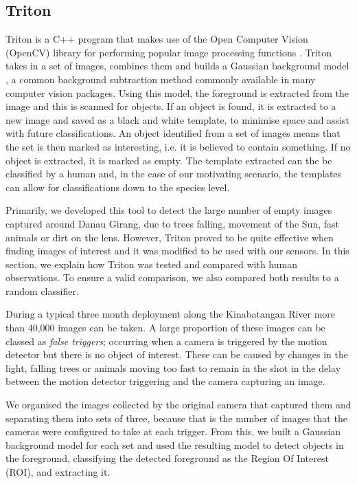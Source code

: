 	\subsection{Triton} \label{tech:sf:triton}
		Triton is a C++ program that makes use of the Open Computer Vision (OpenCV) \cite{opencv_library} library for performing popular image processing functions \cite{triton}. Triton takes in a set of images, combines them and builds a Gaussian background model \cite{Zivkovic2004}, a common background subtraction method commonly available in many computer vision packages. Using this model, the foreground is extracted from the image and this is scanned for objects. If an object is found, it is extracted to a new image and saved as a black and white template, to minimise space and assist with future classifications. An object identified from a set of images means that the set is then marked as interesting, i.e. it is believed to contain something. If no object is extracted, it is marked as empty. The template extracted can the be classified by a human and, in the case of our motivating scenario, the templates can allow for classifications down to the species level.
		
		Primarily, we developed this tool to detect the large number of empty images captured around Danau Girang, due to trees falling, movement of the Sun, fast animals or dirt on the lens. However, Triton proved to be quite effective when finding images of interest and it was modified to be used with our sensors. In this section, we explain how Triton was tested and compared with human observations. To ensure a valid comparison, we also compared both results to a random classifier.
	
		During a typical three month deployment along the Kinabatangan River more than 40,000 images can be taken. A large proportion of these images can be classed as \textit{false triggers}; occurring when a camera is triggered by the motion detector but there is no object of interest. These can be caused by changes in the light, falling trees or animals moving too fast to remain in the shot in the delay between the motion detector triggering and the camera capturing an image.
		
		We organised the images collected by the original camera that captured them and separating them into sets of three, because that is the number of images that the cameras were configured to take at each trigger. From this, we built a Gaussian background model \cite{Zivkovic2004} for each set and used the resulting model to detect objects in the foreground, classifying the detected foreground as the Region Of Interest (ROI), and extracting it.
	
